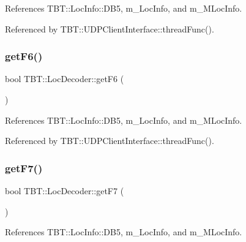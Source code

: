 References T\+B\+T\+::\+Loc\+Info\+::\+D\+B5, m\+\_\+\+Loc\+Info, and m\+\_\+\+M\+Loc\+Info.



Referenced by T\+B\+T\+::\+U\+D\+P\+Client\+Interface\+::thread\+Func().

\mbox{\label{classTBT_1_1LocDecoder_a41b96104eec97905909c8c99c20756e5_a41b96104eec97905909c8c99c20756e5}} 
\subsubsection{\texorpdfstring{get\+F6()}{getF6()}}
{\footnotesize\ttfamily bool T\+B\+T\+::\+Loc\+Decoder\+::get\+F6 (\begin{DoxyParamCaption}{ }\end{DoxyParamCaption})\hspace{0.3cm}{\ttfamily [inline]}}



References T\+B\+T\+::\+Loc\+Info\+::\+D\+B5, m\+\_\+\+Loc\+Info, and m\+\_\+\+M\+Loc\+Info.



Referenced by T\+B\+T\+::\+U\+D\+P\+Client\+Interface\+::thread\+Func().

\mbox{\label{classTBT_1_1LocDecoder_a3f0a6c199b8222c53f047bd32f9060fc_a3f0a6c199b8222c53f047bd32f9060fc}} 
\subsubsection{\texorpdfstring{get\+F7()}{getF7()}}
{\footnotesize\ttfamily bool T\+B\+T\+::\+Loc\+Decoder\+::get\+F7 (\begin{DoxyParamCaption}{ }\end{DoxyParamCaption})\hspace{0.3cm}{\ttfamily [inline]}}



References T\+B\+T\+::\+Loc\+Info\+::\+D\+B5, m\+\_\+\+Loc\+Info, and m\+\_\+\+M\+Loc\+Info.



